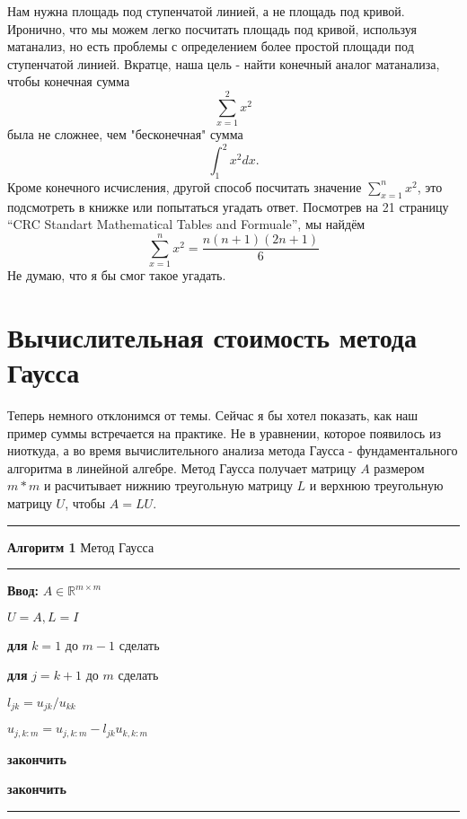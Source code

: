 \documentclass{article}
\begin{document}
Нам нужна площадь под ступенчатой линией, а не площадь под кривой.
Иронично, что мы можем легко посчитать площадь под кривой, используя матанализ, но есть проблемы с определением более простой площади под ступенчатой линией. Вкратце, наша цель - найти конечный аналог матанализа, чтобы конечная сумма
$$ \sum_{x=1}^2 x^2 $$
была не сложнее, чем "бесконечная" сумма
$$\int_1^2 x^2 dx.$$ 
Кроме конечного исчисления, другой способ посчитать значение $\sum_{x=1}^n x^2$, это подсмотреть в книжке или попытаться угадать ответ. Посмотрев на 21 страницу 
``CRC Standart Mathematical Tables and Formuale'', мы найдём
$$\sum_{x=1}^n x^2 = \frac{n(n+1)(2n+1)}{6}$$
Не думаю, что я бы смог такое угадать.
\section{Вычислительная стоимость метода Гаусса}
Теперь немного отклонимся от темы. Сейчас я бы хотел показать, как наш пример суммы встречается на практике. Не в уравнении, которое появилось из ниоткуда,  а во время вычислительного анализа метода Гаусса - фундаментального алгоритма в линейной алгебре. Метод Гаусса получает матрицу $A$ размером $m*m$ и расчитывает нижнию треугольную матрицу $L$ и верхнюю треугольную матрицу $U$, чтобы $A=LU$.
\par\noindent\rule{\textwidth}{0.4pt}
\textbf{Алгоритм 1} Метод Гаусса
\par\noindent\rule{\textwidth}{0.4pt}
\textbf{Ввод:} $A  \in \mathbb{R}^{m \times m}$

$U = A, L = I$

\textbf{для} $k=1$ до $m-1$ сделать

\hphantom{    } \textbf{для} $j=k+1$ до $m$ сделать

\hphantom{        } $l_{jk}=u_{jk}/u_{kk}$

\hphantom{        } $u_{j,k:m}=u_{j,k:m}-l_{jk}u_{k,k:m}$

\hphantom{    }\textbf{закончить}

\textbf{закончить}

\par\noindent\rule{\textwidth}{0.4pt}
\end{document}
